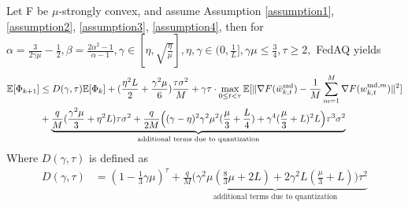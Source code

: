 \documentclass[11pt]{article}
\begin{document}

\begin{lemma} \label{lemmaD.1}
 Let F be $\mu$-strongly convex, and assume Assumption \ref{assumption1}, \ref{assumption2}, \ref{assumption3}, \ref{assumption4}, then for $\alpha=\frac{3}{2\gamma\mu} - \frac{1}{2}, \beta=\frac{2\alpha^2-1}{\alpha-1}, \gamma \in [\eta, \sqrt{\frac{\eta}{\mu}}], \eta, \gamma \in (0, \frac{1}{L}], \gamma\mu \leq \frac{3}{4},\tau \geq 2, $ FedAQ yields
 \begin{align*}
     \mathbb{E}[\Phi_{k+1}] &\leq D(\gamma, \tau) \mathbb{E}[\Phi_k] + (\frac{\eta^2 L}{2} + \frac{\gamma^2\mu}{6})\frac{\tau\sigma^2}{M} + \gamma\tau \cdot \max_{0\leq t <\tau} \mathbb{E}[\|\nabla F(\Bar{w}_{k, t}^{\textrm{md}})- \frac{1}{M} \sum_{m=1}^M \nabla F(w_{k, t}^{\textrm{md}, m})\|^2]\\
     &+ \underbrace{\frac{q}{M}(\frac{\gamma^2\mu}{3}+\eta^2 L)\tau\sigma^2 + \frac{q}{2M}\Big( (\gamma-\eta)^2 \gamma^2\mu^2 (\frac{\mu}{3} + \frac{L}{4}) + \gamma^4 (\frac{\mu}{3} + L)^2 L \Big)\tau^3\sigma^2}_{\textrm{additional terms due to quantization}}
 \end{align*}
 Where $D(\gamma, \tau)$ is defined as
 \begin{align*}
     D(\gamma, \tau) &= (1-\frac{1}{3}\gamma\mu)^\tau + \underbrace{\frac{q}{M}\Big( \gamma^2\mu(\frac{8}{3}\mu + 2L) + 2\gamma^2 L(\frac{\mu}{3} + L)\Big)\tau^2}_{\textrm{additional terms due to quantization}}
 \end{align*}
\end{lemma}
\end{document}
